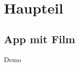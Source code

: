 \documentclass[aspectratio=169]{beamer}
\begin{document}
\section{Haupteil}
\subsection{App mit Film}
\begin{frame}[plain]{Demo}
        \centering
\end{frame}
\end{document}
